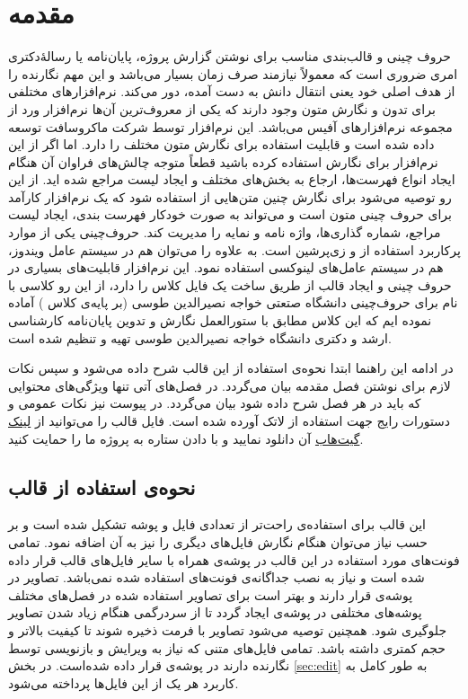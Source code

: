 
\chapter{مقدمه}
حروف چینی و قالب‌بندی مناسب برای نوشتن گزارش پروژه، پایان‌نامه یا رسالهٔ‌دکتری امری ضروری است که معمولاً نیازمند صرف زمان بسیار می‌باشد و این مهم نگارنده را از هدف اصلی خود یعنی انتقال دانش به دست آمده، دور می‌کند. نرم‌افزارهای مختلفی برای تدون و نگارش متون وجود دارند که یکی از معروف‌ترین آن‌ها نرم‌افزار ورد%
از مجموعه نرم‌افزار‌های آفیس می‌باشد. این نرم‌افزار توسط شرکت ماکروسافت توسعه داده شده است و قابلیت استفاده برای نگارش متون مختلف را دارد. اما اگر از این نرم‌افزار برای نگارش \پ استفاده کرده باشید قطعاً متوجه چالش‌های فراوان آن هنگام ایجاد انواع فهرست‌ها، ارجاع به بخش‌های مختلف و ایجاد لیست مراجع شده اید. از این رو توصیه می‌شود برای نگارش چنین متن‌هایی از 
\lr{\LaTeX}
استفاده شود که یک نرم‌افزار کارآمد برای حروف چینی متون است و می‌تواند به صورت خودکار فهرست بندی، ایجاد لیست مراجع، شماره گذاری‌ها، واژه نامه و نمایه را مدیریت کند. حروف‌چینی \پ یکی از موارد پرکاربرد استفاده از
\lr{\LaTeX}
و زی‌پرشین
\cite{Khalighi87xepersian}
است. به علاوه
\lr{\LaTeX}
را می‌توان هم در سیستم عامل ویندوز، هم در سیستم عامل‌های لینوکسی استفاده نمود. این نرم‌افزار قابلیت‌های بسیاری در حروف چینی و ایجاد قالب از طریق ساخت یک فایل کلاس را دارد، از این رو  کلاسی با نام 
برای حروف‌چینی \پ دانشگاه صتعتی خواجه نصیرالدین طوسی (بر پایه‌ی کلاس
) آماده نموده ایم که این کلاس مطابق با ستورالعمل نگارش و تدوین پایان‌نامه کارشناسی ارشد و دکتری دانشگاه خواجه نصیرالدین طوسی
\cite{KNTUThesisGuide}
تهیه و تنظیم شده است. 

در ادامه این راهنما ابتدا نحوه‌ی استفاده از این قالب شرح داده می‌شود و سپس نکات لازم برای نوشتن فصل مقدمه بیان می‌گردد. در فصل‌های آتی تنها ویژگی‌های محتوایی که باید در هر فصل شرح داده شود بیان می‌گردد. در پیوست نیز نکات عمومی و دستورات رایج جهت استفاده از لاتک آورده شده است. فایل قالب را می‌توانید از 
\href{https://github.com/msinamsina/kntu-thesis}{لینک گیت‌هاب}
 آن دانلود نمایید و با دادن ستاره  به  پروژه  ما را حمایت کنید. 

\section{نحوه‌ی استفاده از قالب}
این قالب برای استفاده‌ی راحت‌تر از تعدادی فایل و پوشه تشکیل شده است و بر حسب نیاز می‌توان هنگام نگارش
فایل‌های دیگری را نیز به آن اضافه نمود. تمامی فونت‌های مورد استفاده در این قالب در پوشه‌ی 
همراه با سایر فایل‌های قالب قرار داده شده است و نیاز به نصب جداگانه‌ی فونت‌های استفاده شده نمی‌باشد.
تصاویر در پوشه‌ی 
قرار دارند و بهتر است برای تصاویر استفاده ‌شده در فصل‌های مختلف پوشه‌های مختلفی در پوشه‌ی
ایجاد گردد تا از سردرگمی ‌هنگام زیاد شدن تصاویر جلوگیری شود. همچنین توصیه می‌شود تصاویر با فرمت
ذخیره شوند تا کیفیت بالاتر و حجم کمتری داشته باشد.
تمامی فایل‌های متنی که نیاز به ویرایش و بازنویسی توسط نگارنده \پ دارند در پوشه‌ی
قرار داده شده‌است. در بخش
\ref{sec:edit}
به طور کامل به کاربرد هر یک از این فایل‌ها پرداخته می‌شود.


